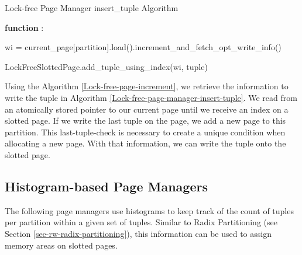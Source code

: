 \begin{algorithm}[h]
  \caption{Lock-free Page Manager insert\_tuple Algorithm}
  \label{Lock-free-page-manager-insert-tuple}



  \textbf{function} :

  wi = current\_page[partition].load().increment\_and\_fetch\_opt\_write\_info()



  LockFreeSlottedPage.add\_tuple\_using\_index(wi, tuple) \end{algorithm} Using the Algorithm \ref{Lock-free-page-increment}, we retrieve the information to write the tuple in Algorithm \ref{Lock-free-page-manager-insert-tuple}.
We read from an atomically stored pointer to our current page until we receive an index on a slotted page.
If we write the last tuple on the page, we add a new page to this partition.
This last-tuple-check is necessary to create a unique condition when allocating a new page.
With that information, we can write the tuple onto the slotted page.
\subsection{Histogram-based Page Managers}
The following page managers use histograms to keep track of the count of tuples per partition within a given set of tuples.
Similar to Radix Partitioning (see Section \ref{sec-rw-radix-partitioning}), this information can be used to assign memory areas on slotted pages.
